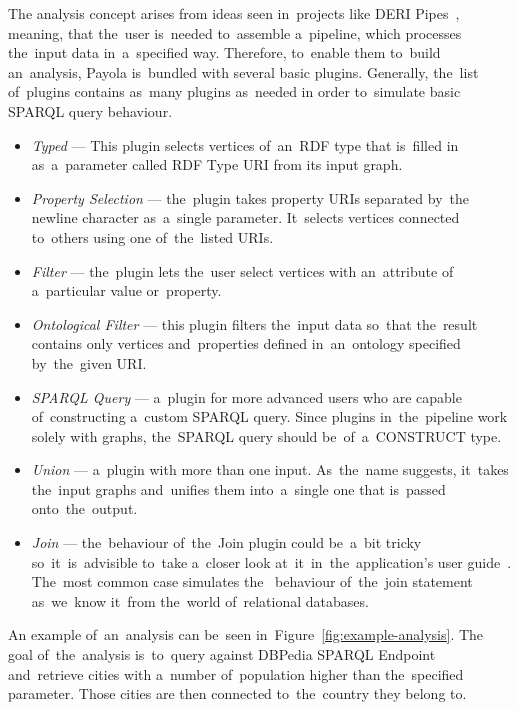 The analysis concept arises from ideas seen in~projects like DERI 
Pipes~\cite{deri-pipes}, meaning, that the~user is~needed to~assemble a~pipeline,
which processes the~input data in~a~specified way. Therefore, to~enable them to~build an~analysis, Payola is~bundled with several basic 
plugins. Generally, the~list of~plugins contains as~many plugins as~needed
in order to~simulate basic SPARQL query behaviour.

\begin{itemize}
  \item \emph{Typed} --- This plugin selects vertices of~an~RDF type that is~filled in
  as~a~parameter called RDF Type URI from its input graph.
  
  \item \emph{Property Selection} --- the~plugin takes property URIs separated by~the
  newline character as~a~single parameter. It~selects vertices connected
  to~others using one of~the~listed URIs.
  
  \item \emph{Filter} --- the~plugin lets the~user select vertices with an~attribute of
  a~particular value or~property.
 
  \item \emph{Ontological Filter} --- this plugin filters the~input data so~that the~result contains only vertices and~properties defined in~an~ontology specified 
  by~the~given URI.
  
  \item \emph{SPARQL Query} --- a~plugin for more advanced users who are capable of~constructing a~custom SPARQL query. Since plugins in~the~pipeline work solely with 
  graphs, the~SPARQL query should be~of~a~CONSTRUCT type.
  
  \item \emph{Union} --- a~plugin with more than one input. As~the~name suggests, it~takes 
  the~input graphs and~unifies them into~a~single one that is~passed onto~the~output.
  
  \item \emph{Join} --- the~behaviour of~the~Join plugin could be~a~bit tricky so~it~is~advisible
  to~take a~closer look at~it~in~the~application's 
  user guide~\cite{payola:ug:join-plugin}. The~most common case simulates the~  behaviour of~the~join statement as~we~know it~from the~world of~relational 
  databases.
  
\end{itemize}

An example of~an~analysis can be~seen in~Figure~\ref{fig:example-analysis}.
The goal of~the~analysis is~to~query against DBPedia SPARQL Endpoint and~retrieve cities with a~number of~population higher than the~specified parameter. 
Those cities are then connected to~the~country they belong to.

